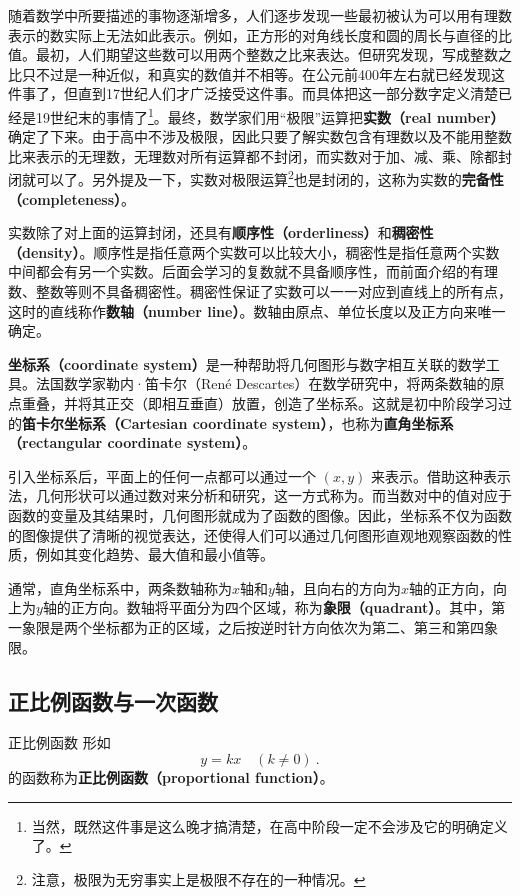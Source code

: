 随着数学中所要描述的事物逐渐增多，人们逐步发现一些最初被认为可以用有理数表示的数实际上无法如此表示。例如，正方形的对角线长度和圆的周长与直径的比值。最初，人们期望这些数可以用两个整数之比来表达。但研究发现，写成整数之比只不过是一种近似，和真实的数值并不相等。在公元前400年左右就已经发现这件事了，但直到17世纪人们才广泛接受这件事。而具体把这一部分数字定义清楚已经是19世纪末的事情了\footnote{当然，既然这件事是这么晚才搞清楚，在高中阶段一定不会涉及它的明确定义了。}。最终，数学家们用“极限”运算把\textbf{实数（real number）}确定了下来。由于高中不涉及极限，因此只要了解实数包含有理数以及不能用整数比来表示的无理数，无理数对所有运算都不封闭，而实数对于加、减、乘、除都封闭就可以了。另外提及一下，实数对极限运算\footnote{注意，极限为无穷事实上是极限不存在的一种情况。}也是封闭的，这称为实数的\textbf{完备性（completeness）}。

实数除了对上面的运算封闭，还具有\textbf{顺序性（orderliness）}和\textbf{稠密性（density）}。顺序性是指任意两个实数可以比较大小，稠密性是指任意两个实数中间都会有另一个实数。后面会学习的复数就不具备顺序性，而前面介绍的有理数、整数等则不具备稠密性。稠密性保证了实数可以一一对应到直线上的所有点，这时的直线称作\textbf{数轴（number line）}。数轴由原点、单位长度以及正方向来唯一确定。

\textbf{坐标系（coordinate system）}是一种帮助将几何图形与数字相互关联的数学工具。法国数学家勒内·笛卡尔（René Descartes）在数学研究中，将两条数轴的原点重叠，并将其正交（即相互垂直）放置，创造了坐标系。这就是初中阶段学习过的\textbf{笛卡尔坐标系（Cartesian coordinate system）}，也称为\textbf{直角坐标系（rectangular coordinate system）}。

引入坐标系后，平面上的任何一点都可以通过一个 $(x, y)$ 来表示。借助这种表示法，几何形状可以通过数对来分析和研究，这一方式称为。而当数对中的值对应于函数的变量及其结果时，几何图形就成为了函数的图像。因此，坐标系不仅为函数的图像提供了清晰的视觉表达，还使得人们可以通过几何图形直观地观察函数的性质，例如其变化趋势、最大值和最小值等。

通常，直角坐标系中，两条数轴称为$x$轴和$y$轴，且向右的方向为$x$轴的正方向，向上为$y$轴的正方向。数轴将平面分为四个区域，称为\textbf{象限（quadrant）}。其中，第一象限是两个坐标都为正的区域，之后按逆时针方向依次为第二、第三和第四象限。

\subsection{正比例函数与一次函数}

\begin{definition}{正比例函数}
形如
\begin{equation}
y = kx\quad(k\neq0)~.
\end{equation}
的函数称为\textbf{正比例函数（proportional function）}。
\end{definition}

